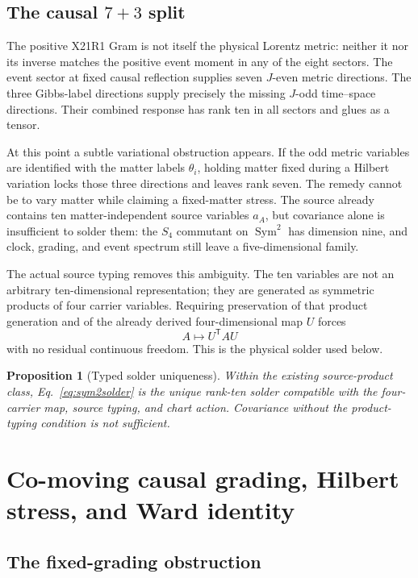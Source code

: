 \documentclass[11pt]{article}
\newtheorem{proposition}[theorem]{Proposition}
\theoremstyle{definition}
\theoremstyle{remark}
\newcommand{\Sym}{\operatorname{Sym}}
\begin{document}
\subsection{The causal $7+3$ split}

The positive X21R1 Gram is not itself the physical Lorentz metric: neither it nor its inverse matches the positive event moment in any of the eight sectors. The event sector at fixed causal reflection supplies seven $J$-even metric directions. The three Gibbs-label directions supply precisely the missing $J$-odd time--space directions. Their combined response has rank ten in all sectors and glues as a tensor.

At this point a subtle variational obstruction appears. If the odd metric variables are identified with the matter labels $\theta_i$, holding matter fixed during a Hilbert variation locks those three directions and leaves rank seven. The remedy cannot be to vary matter while claiming a fixed-matter stress. The source already contains ten matter-independent source variables $a_A$, but covariance alone is insufficient to solder them: the $S_4$ commutant on $\Sym^2$ has dimension nine, and clock, grading, and event spectrum still leave a five-dimensional family.

The actual source typing removes this ambiguity. The ten variables are not an arbitrary ten-dimensional representation; they are generated as symmetric products of four carrier variables. Requiring preservation of that product generation and of the already derived four-dimensional map $U$ forces
\begin{equation}\label{eq:sym2solder}
 A\longmapsto U^{\mathsf T}AU
\end{equation}
with no residual continuous freedom. This is the physical solder used below.

\begin{proposition}[Typed solder uniqueness]\label{prop:solder}
Within the existing source-product class, Eq.~\eqref{eq:sym2solder} is the unique rank-ten solder compatible with the four-carrier map, source typing, and chart action. Covariance without the product-typing condition is not sufficient.
\end{proposition}

\section{Co-moving causal grading, Hilbert stress, and Ward identity}

\subsection{The fixed-grading obstruction}
\end{document}
